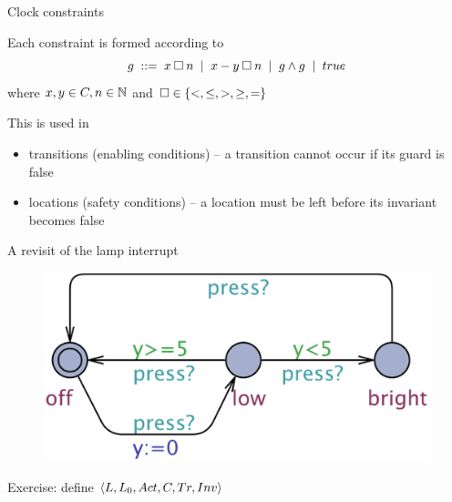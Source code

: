 \documentclass{beamer}
\begin{document}
\begin{slide}{Clock constraints}

Each constraint is formed according to 
\begin{equation*}
  g \; ::=\; x \mathbin{\square} n \; \mid\; x - y \mathbin{\square} n  \; \mid\; g \mathbin{\wedge} g \;\mid\; true
\end{equation*}
where $x,y \in C, n \in \mathbb{N}$ and $\square \in \mathopen{ \{ }<,\leq,>,\geq,=\mathclose{ \} }$

This is used in
\begin{itemize}
\item transitions (enabling conditions) -- a transition cannot occur
  if its guard is false
\item locations (safety conditions) -- a location must be left before
  its invariant becomes false
\end{itemize}

\end{slide}

\begin{frame}{A revisit of the lamp interrupt}
  
\begin{figure}[htb]
  \centering
  \includegraphics[scale=0.35]{./images/Lamp.pdf}\\
\end{figure}

Exercise: define $\mathopen{\langle}L, L_0, Act, C, Tr, Inv\mathclose{\rangle}$ 

\end{frame}

\end{document}
